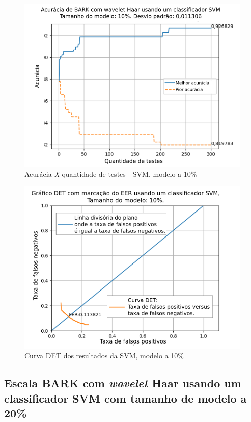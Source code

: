 			\begin{figure}[H]
				\centering
				\includegraphics[width=.8\linewidth]{images/results/confusionMatrices/classifier_SVM_10.png}
				\caption{Acurácia \textit{X} quantidade de testes - SVM, modelo a 10\%}
				\label{fig:classifiersvm10}
			\end{figure}
		
			\begin{figure}[H]
				\centering
				\includegraphics[width=.9\linewidth]{images/results/det/DET_SVM_10}
				\caption{Curva DET dos resultados da SVM, modelo a 10\%}
				\label{fig:detsvm10}
			\end{figure}

		\FloatBarrier
		\subsection{Escala BARK com \textit{wavelet} Haar usando um classificador SVM com tamanho de modelo a 20\%}

